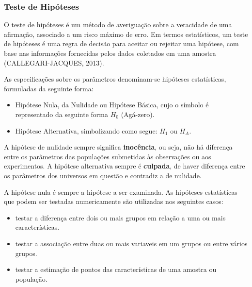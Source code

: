 \subsubsection{Teste de Hipóteses}

O teste de hipóteses é um método de averiguação sobre a veracidade de uma afirmação, associado a um risco máximo de erro. Em termos estatísticos, um teste de hipóteses é uma regra de decisão para aceitar ou rejeitar uma hipótese, com base nas informações fornecidas pelos dados coletados em uma amostra (CALLEGARI-JACQUES, 2013).\vskip0.3cm








As especificações sobre os parâmetros denominam-se hipóteses estatísticas, formuladas da seguinte forma:

\begin{itemize}
\item Hipótese Nula, da Nulidade ou Hipótese Básica, cujo o símbolo é representado da seguinte forma $H_{0}$ (Agá-zero).
\item Hipótese Alternativa, simbolizando como segue: $H_{1}$ ou $H_{A}$.
\end{itemize}

A hipótese de nulidade sempre significa \textbf{inocência}, ou seja, não há diferença entre os parâmetros das populações submetidas às observações ou aos experimentos. A hipótese alternativa sempre é \textbf{culpada}, de haver diferença entre os parâmetros dos universos em questão e contradiz a de nulidade.\vskip0.3cm



A hipótese nula é sempre a hipótese a ser examinada. As hipóteses estatísticas que podem ser testadas numericamente são utilizadas nos seguintes casos:

\begin{itemize}
\item testar a diferença entre dois ou mais grupos em relação a uma ou mais características.
\item testar a associação entre duas ou mais variaveis em um grupos ou entre vários grupos. 
\item testar a estimação de pontos das características de uma amostra ou população.
\end{itemize}


